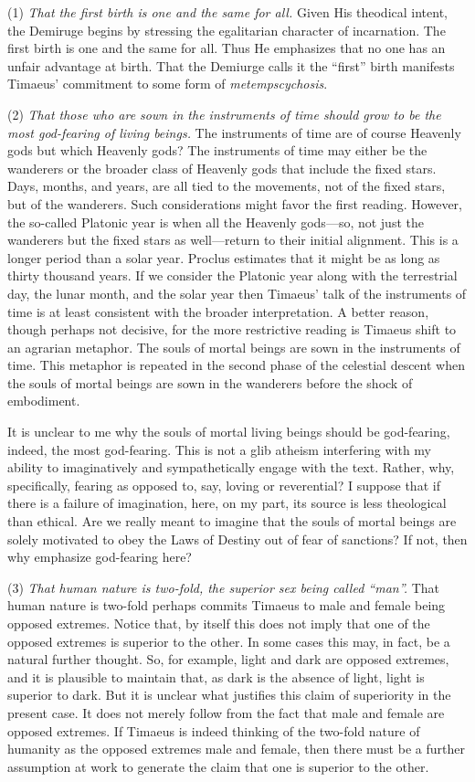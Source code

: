 (1) \emph{That the first birth is one and the same for all.} Given His theodical intent, the Demiruge begins by stressing the egalitarian character of incarnation. The first birth is one and the same for all. Thus He emphasizes that no one has an unfair advantage at birth. That the Demiurge calls it the ``first'' birth manifests Timaeus' commitment to some form of \emph{metempscychosis}.

(2) \emph{That those who are sown in the instruments of time should grow to be the most god-fearing of living beings.} The instruments of time are of course Heavenly gods but which Heavenly gods? The instruments of time may either be the wanderers or the broader class of Heavenly gods that include the fixed stars. Days, months, and years, are all tied to the movements, not of the fixed stars, but of the wanderers. Such considerations might favor the first reading. However, the so-called Platonic year is when all the Heavenly gods---so, not just the wanderers but the fixed stars as well---return to their initial alignment. This is a longer period than a solar year. Proclus estimates that it might be as long as thirty thousand years. If we consider the Platonic year along with the terrestrial day, the lunar month, and the solar year then Timaeus' talk of the instruments of time is at least consistent with the broader interpretation. A better reason, though perhaps not decisive, for the more restrictive reading is Timaeus shift to an agrarian metaphor. The souls of mortal beings are sown in the instruments of time. This metaphor is repeated in the second phase of the celestial descent when the souls of mortal beings are sown in the wanderers before the shock of embodiment.

It is unclear to me why the souls of mortal living beings should be god-fearing, indeed, the most god-fearing. This is not a glib atheism interfering with my ability to imaginatively and sympathetically engage with the text. Rather, why, specifically, fearing as opposed to, say, loving or reverential? I suppose that if there is a failure of imagination, here, on my part, its source is less theological than ethical. Are we really meant to imagine that the souls of mortal beings are solely motivated to obey the Laws of Destiny out of fear of sanctions? If not, then why emphasize god-fearing here?

(3) \emph{That human nature is two-fold, the superior sex being called ``man''.} That human nature is two-fold perhaps commits Timaeus to male and female being opposed extremes. Notice that, by itself this does not imply that one of the opposed extremes is superior to the other. In some cases this may, in fact, be a natural further thought. So, for example, light and dark are opposed extremes, and it is plausible to maintain that, as dark is the absence of light, light is superior to dark. But it is unclear what justifies this claim of superiority in the present case. It does not merely follow from the fact that male and female are opposed extremes. If Timaeus is indeed thinking of the two-fold nature of humanity as the opposed extremes male and female, then there must be a further assumption at work to generate the claim that one is superior to the other.

